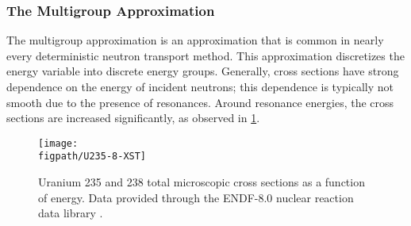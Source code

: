 {{{            \subsubsection{The Multigroup Approximation}{\label{sssec:NTT:The Multigroup Approximation}
                The multigroup approximation is an approximation that is common in nearly every deterministic neutron transport method.
                This approximation discretizes the energy variable into discrete energy groups.
                Generally, cross sections have strong dependence on the energy of incident neutrons; this dependence is typically not smooth due to the presence of resonances.
                Around resonance energies, the cross sections are increased significantly, as observed in \cref{fig:NTT:Cross Section plot}.

                \begin{figure}[h]
                    \centering
                    \texttt{[image: \\figpath/U235-8-XST]}
                    \caption{Uranium 235 and 238 total microscopic cross sections as a function of energy. Data provided through the ENDF-8.0 nuclear reaction data library \cite{ENDF8}.}
                    \label{fig:NTT:Cross Section plot}
                \end{figure}

}}}}

